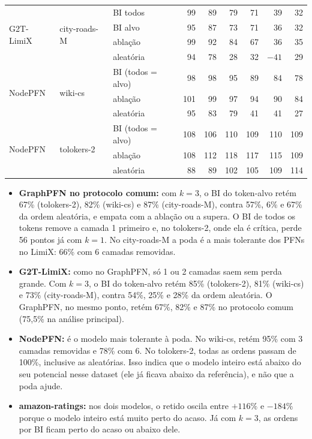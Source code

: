 \documentclass[12pt,a4paper]{article}
\begin{document}
\begin{table}[H]
{\begin{tabular}{@{}lllrrrrrr@{}}
\midrule
\multirow{4}{*}{G2T-LimiX} & \multirow{4}{*}{city-roads-M}
  & BI todos  & 99 & 89 & 79 & 71 & 39 & 32 \\
 & & BI alvo  & 95 & 87 & 73 & 71 & 36 & 32 \\
 & & ablação  & 99 & 92 & 84 & 67 & 36 & 35 \\
 & & aleatória & 94 & 78 & 28 & 32 & $-41$ & 29 \\
\midrule
\multirow{3}{*}{NodePFN} & \multirow{3}{*}{wiki-cs}
  & BI (todos = alvo) & 98 & 98 & 95 & 89 & 84 & 78 \\
 & & ablação  & 101 & 99 & 97 & 94 & 90 & 84 \\
 & & aleatória & 95 & 83 & 79 & 41 & 41 & 27 \\
\midrule
\multirow{3}{*}{NodePFN} & \multirow{3}{*}{tolokers-2}
  & BI (todos = alvo) & 108 & 106 & 110 & 109 & 110 & 109 \\
 & & ablação  & 108 & 112 & 118 & 117 & 115 & 109 \\
 & & aleatória & 88 & 89 & 102 & 105 & 109 & 114 \\
\bottomrule
\end{tabular}}
\end{table}

\begin{itemize}
  \item \textbf{GraphPFN no protocolo comum:} com $k=3$, o BI do token-alvo retém 67\% (tolokers-2), 82\% (wiki-cs) e 87\% (city-roads-M), contra 57\%, 6\% e 67\% da ordem aleatória, e empata com a ablação ou a supera. O BI de todos os tokens remove a camada 1 primeiro e, no tolokers-2, onde ela é crítica, perde 56 pontos já com $k=1$. No city-roads-M a poda é a mais tolerante dos PFNs no LimiX: 66\% com 6 camadas removidas.
  \item \textbf{G2T-LimiX:} como no GraphPFN, só 1 ou 2 camadas saem sem perda grande. Com $k=3$, o BI do token-alvo retém 85\% (tolokers-2), 81\% (wiki-cs) e 73\% (city-roads-M), contra 54\%, 25\% e 28\% da ordem aleatória. O GraphPFN, no mesmo ponto, retém 67\%, 82\% e 87\% no protocolo comum (75,5\% na análise principal).
  \item \textbf{NodePFN:} é o modelo mais tolerante à poda. No wiki-cs, retém 95\% com 3 camadas removidas e 78\% com 6. No tolokers-2, todas as ordens passam de 100\%, inclusive as aleatórias. Isso indica que o modelo inteiro está abaixo do seu potencial nesse dataset (ele já ficava abaixo da referência), e não que a poda ajude.
  \item \textbf{amazon-ratings:} nos dois modelos, o retido oscila entre $+116\%$ e $-184\%$ porque o modelo inteiro está muito perto do acaso. Já com $k=3$, as ordens por BI ficam perto do acaso ou abaixo dele.
\end{itemize}
\end{document}
